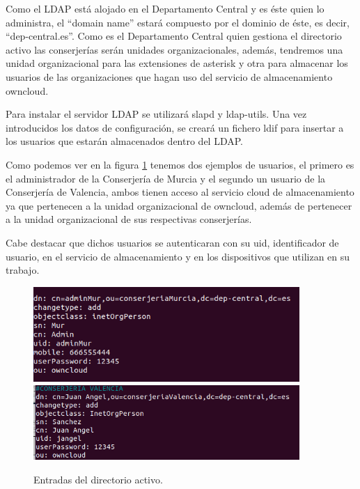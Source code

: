 \documentclass[a4paper]{article}
\begin{document}
Como el LDAP está alojado en el Departamento Central y es éste quien lo administra, el ``domain name'' estará compuesto por el dominio de éste, es decir, ``dep-central.es''. Como es el Departamento Central quien gestiona el directorio activo las conserjerías serán unidades organizacionales, además, tendremos una unidad organizacional para las extensiones de asterisk y otra para almacenar los usuarios de las organizaciones que hagan uso del servicio de almacenamiento owncloud.

Para instalar el servidor LDAP se utilizará slapd y ldap-utils. Una vez introducidos los datos de configuración, se creará un fichero ldif para insertar a los usuarios que estarán almacenados dentro del LDAP.

Como podemos ver en la figura \ref{fig:users} tenemos dos ejemplos de usuarios, el primero es el administrador de la Conserjería de Murcia y el segundo un usuario de la Conserjería de Valencia, ambos tienen acceso al servicio cloud de almacenamiento ya que pertenecen a la unidad organizacional de owncloud, además de pertenecer a la unidad organizacional de sus respectivas conserjerías. 

Cabe destacar que dichos usuarios se autenticaran con su uid, identificador de usuario, en el servicio de almacenamiento y en los dispositivos que utilizan en su trabajo.

\begin{figure}[htb]
    \begin{center}
        \includegraphics[width=0.9\textwidth]{ldap/user1.png}
        \includegraphics[width=0.9\textwidth]{ldap/user2.png}
        \caption{Entradas del directorio activo.}
         \label{fig:users}
    \end{center}
\end{figure}
\end{document}
